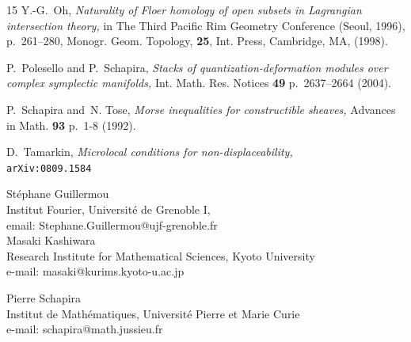 \documentclass[12pt,leqno]{article}
\theoremstyle{definition}
\numberwithin{equation}{section}
\begin{document}
\begin{thebibliography}{15}
 Y.-G.~Oh,
{\em Naturality of Floer homology of open subsets in Lagrangian intersection
 theory,}  
in The Third Pacific Rim Geometry Conference (Seoul, 1996), p.~261--280,
Monogr. Geom. Topology, {\bf 25}, Int. Press, Cambridge, MA, (1998).

 P.~Polesello and P.~Schapira,
{\em Stacks of quantization-deformation modules  over complex
symplectic manifolds,}  
\/Int. Math. Res. Notices {\bf 49} p.~2637--2664 (2004).

 P.~Schapira and~N. Tose,
{\em Morse inequalities for constructible sheaves,}
Advances in Math. {\bf 93} p.~1-8 (1992).

 D.~Tamarkin, 
{\em Microlocal conditions for non-displaceability,}\\
\/\texttt{arXiv:0809.1584}

\end{thebibliography}



\vspace*{1cm}
\noindent
\parbox[t]{21em}
{\scriptsize{
\noindent
St{\'e}phane Guillermou\\
Institut Fourier, Universit{\'e} de Grenoble I, \\
email: Stephane.Guillermou@ujf-grenoble.fr\\

\medskip\noindent
Masaki Kashiwara\\
Research Institute for Mathematical Sciences, Kyoto University \\  
e-mail: masaki@kurims.kyoto-u.ac.jp

\medskip\noindent
Pierre Schapira\\
Institut de Math{\'e}matiques,
Universit{\'e} Pierre et Marie Curie\\
e-mail: schapira@math.jussieu.fr\\
}}
\end{document}
